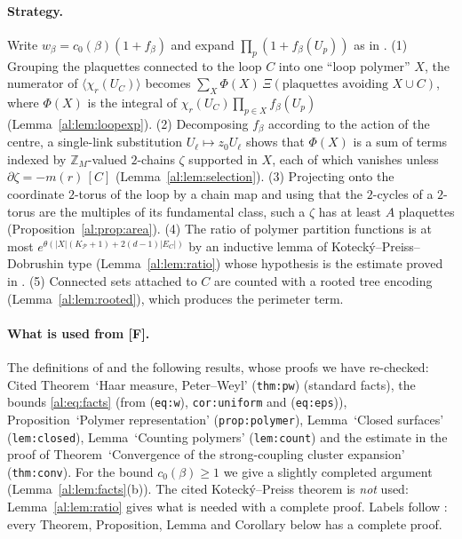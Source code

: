 \documentclass[11pt,a4paper]{article}
\theoremstyle{definition}
\theoremstyle{remark}
\newcommand{\Z}{\mathbb{Z}}
\newcommand{\cP}{\mathcal{P}}
\newcommand{\Fref}[3]{\cite[#1~`#2' (\texttt{#3})]{F}}
\newcommand{\Fname}[2]{\cite[#1~`#2']{F}}
\begin{document}
\paragraph{Strategy.} Write $w_\beta=c_0(\beta)(1+f_\beta)$ and expand $\prod_p(1+f_\beta(U_p))$ as in \cite{F}.
(1) Grouping the plaquettes connected to the loop $C$ into one ``loop polymer'' $X$, the numerator of
$\langle\chi_r(U_C)\rangle$ becomes $\sum_X\Phi(X)\,\Xi(\text{plaquettes avoiding }X\cup C)$, where $\Phi(X)$ is the integral
of $\chi_r(U_C)\prod_{p\in X}f_\beta(U_p)$ (Lemma~\ref{al:lem:loopexp}). (2) Decomposing $f_\beta$ according to the
action of the centre, a single-link substitution $U_\ell\mapsto z_0U_\ell$ shows that $\Phi(X)$ is a sum of terms
indexed by $\Z_M$-valued $2$-chains $\zeta$ supported in $X$, each of which vanishes unless
$\partial\zeta=-m(r)\,[C]$ (Lemma~\ref{al:lem:selection}). (3) Projecting onto the coordinate $2$-torus of the loop by
a chain map and using that the $2$-cycles of a $2$-torus are the multiples of its fundamental class, such a $\zeta$ has
at least $A$ plaquettes (Proposition~\ref{al:prop:area}). (4) The ratio of polymer partition functions is at most
$e^{\theta(|X|(K_\cP+1)+2(d-1)|E_C|)}$ by an inductive lemma of Kotecký--Preiss--Dobrushin type
(Lemma~\ref{al:lem:ratio}) whose hypothesis is the estimate proved in \cite{F}. (5) Connected sets attached to $C$ are
counted with a rooted tree encoding (Lemma~\ref{al:lem:rooted}), which produces the perimeter term.

\paragraph{What is used from [F].} The definitions of \cite{F} and the following results, whose proofs we have
re-checked: Cited Theorem~`Haar measure, Peter--Weyl' (\texttt{thm:pw}) (standard facts), the bounds
\eqref{al:eq:facts} (from (\texttt{eq:w}), \texttt{cor:uniform} and (\texttt{eq:eps})), Proposition~`Polymer
representation' (\texttt{prop:polymer}), Lemma~`Closed surfaces' (\texttt{lem:closed}), Lemma~`Counting polymers'
(\texttt{lem:count}) and the estimate in the proof of Theorem~`Convergence of the strong-coupling cluster expansion'
(\texttt{thm:conv}). For the bound $c_0(\beta)\ge1$ we give a slightly completed argument
(Lemma~\ref{al:lem:facts}(b)). The cited Kotecký--Preiss theorem \Fref{Cited Theorem}{Kotecký--Preiss
1986}{thm:KP} is \emph{not} used: Lemma~\ref{al:lem:ratio} gives what is needed with a complete proof. Labels follow
\Fname{Convention}{Labels}: every Theorem, Proposition, Lemma and Corollary below has a complete proof.
\end{document}
